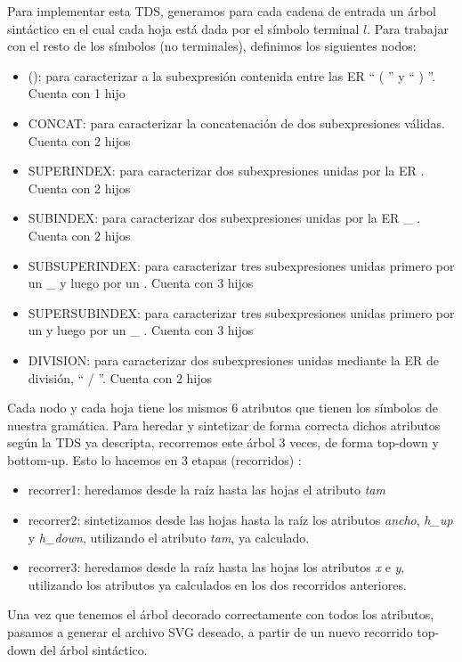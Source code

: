 \documentclass[a4paper, 10pt, twoside]{article}
\begin{document}
Para implementar esta TDS, generamos para cada cadena de entrada un árbol sintáctico en el cual cada hoja está dada por el símbolo terminal $l$. Para trabajar con el resto de los símbolos (no terminales), definimos los siguientes nodos:
\begin{itemize} 
  \item (): para caracterizar a la subexpresión contenida entre las ER `` ( '' y `` ) ''. Cuenta con 1 hijo
  \item CONCAT: para caracterizar la concatenación de dos subexpresiones válidas. Cuenta con 2 hijos
  \item SUPERINDEX: para caracterizar dos subexpresiones unidas por la ER \detokenize{^}. Cuenta con 2 hijos
  \item SUBINDEX: para caracterizar dos subexpresiones unidas por la ER \_ . Cuenta con 2 hijos
  \item SUBSUPERINDEX: para caracterizar tres subexpresiones unidas primero por un \_ y luego por un \detokenize{^}. Cuenta con 3 hijos
  \item SUPERSUBINDEX: para caracterizar tres subexpresiones unidas primero por un \detokenize{^} y luego por un \_ . Cuenta con 3 hijos
  \item DIVISION: para caracterizar dos subexpresiones unidas mediante la ER de división, `` / ''. Cuenta con 2 hijos
\end{itemize}

Cada nodo y cada hoja tiene los mismos 6 atributos que tienen los símbolos de nuestra gramática. Para heredar y sintetizar de forma correcta dichos atributos según la TDS ya descripta, recorremos este árbol 3 veces, de forma top-down y bottom-up. Esto lo hacemos en 3 etapas (recorridos) :
\begin{itemize}
  \item recorrer1: heredamos desde la raíz hasta las hojas el atributo \emph{tam} 
  \item recorrer2: sintetizamos desde las hojas hasta la raíz los atributos \emph{ancho}, \emph{h\_up} y \emph{h\_down}, utilizando el atributo \emph{tam}, ya calculado.
  \item recorrer3: heredamos desde la raíz hasta las hojas los atributos \emph{x} e \emph{y}, utilizando los atributos ya calculados en los dos recorridos anteriores.
\end{itemize}

Una vez que tenemos el árbol decorado correctamente con todos los atributos, pasamos a generar el archivo SVG deseado, a partir de un nuevo recorrido top-down del árbol sintáctico.
\end{document}
